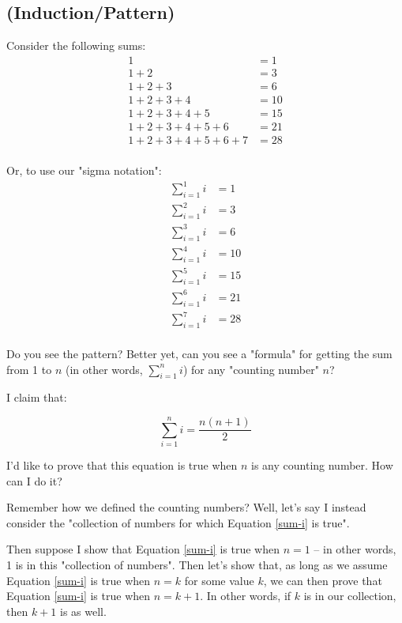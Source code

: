 \documentclass{book}
\begin{document}

\subsection{(Induction/Pattern)}

Consider the following sums:
\begin{align*}
1 &= 1 \\
1 + 2 &= 3 \\
1 + 2 + 3 &= 6 \\
1 + 2 + 3 + 4 &= 10 \\
1 + 2 + 3 + 4 + 5 &= 15 \\
1 + 2 + 3 + 4 + 5 + 6 &= 21 \\
1 + 2 + 3 + 4 + 5 + 6 + 7 &= 28 \\
\end{align*}

Or, to use our "sigma notation":
\begin{align*}
\sum_{i=1}^1 i &= 1 \\
\sum_{i=1}^2 i &= 3 \\
\sum_{i=1}^3 i &= 6 \\
\sum_{i=1}^4 i &= 10 \\
\sum_{i=1}^5 i &= 15 \\
\sum_{i=1}^6 i &= 21 \\
\sum_{i=1}^7 i &= 28 \\
\end{align*}

Do you see the pattern? Better yet, can you see a "formula" for getting the sum from 1 to $n$ (in other words, $\sum_{i=1}^n i$) for any "counting number" $n$?

\newpage

I claim that:

\begin{equation}
\label{sum-i}
\sum_{i=1}^n i = \frac{n(n+1)}{2}
\end{equation}

I'd like to prove that this equation is true when $n$ is any counting number. How can I do it? 

Remember how we defined the counting numbers? Well, let's say I instead consider the "collection of numbers for which Equation \ref{sum-i} is true". 

Then suppose I show that Equation \ref{sum-i} is true when $n = 1$ -- in other words, 1 is in this "collection of numbers". Then let's show that, as long as we assume Equation \ref{sum-i} is true when $n = k$ for some value $k$, we can then prove that Equation \ref{sum-i} is true when $n = k + 1$. In other words, if $k$ is in our collection, then $k+1$ is as well.
\end{document}
